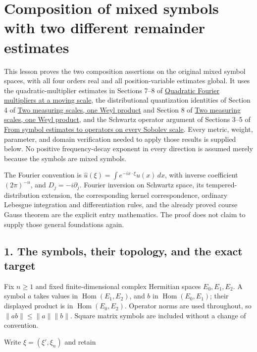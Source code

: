 \documentclass[
  11pt,
]{article}
\author{}
\date{}
\begin{document}
\section{Composition of mixed symbols with two different remainder
estimates}\label{composition-of-mixed-symbols-with-two-different-remainder-estimates}

This lesson proves the two composition assertions on the original mixed
symbol spaces, with all four orders real and all position-variable
estimates global. It uses the quadratic-multiplier estimates in Sections
7--8 of \href{gauss-transform-estimates.pdf}{Quadratic Fourier
multipliers at a moving scale}, the distributional quantization
identities of Section 4 of \href{weyl-metric-products.pdf}{Two measuring
scales, one Weyl product} and Section 8 of
\href{weyl-metric-products.pdf}{Two measuring scales, one Weyl product},
and the Schwartz operator argument of Sections 3--5 of
\href{euclidean-symbol-calculus.pdf}{From symbol estimates to operators
on every Sobolev scale}. Every metric, weight, parameter, and domain
verification needed to apply those results is supplied below. No
positive frequency-decay exponent in every direction is assumed merely
because the symbols are mixed symbols.

The Fourier convention is
\(\widehat u(\xi)=\int e^{-ix\cdot\xi}u(x)\,dx\), with inverse
coefficient \((2\pi)^{-n}\), and \(D_j=-i\partial_j\). Fourier inversion
on Schwartz space, its tempered-distribution extension, the
corresponding kernel correspondence, ordinary Lebesgue integration and
differentiation rules, and the already proved course Gauss theorem are
the explicit entry mathematics. The proof does not claim to supply those
general foundations again.

\subsection{1. The symbols, their topology, and the exact
target}\label{the-symbols-their-topology-and-the-exact-target}

Fix \(n\geq1\) and fixed finite-dimensional complex Hermitian spaces
\(E_0,E_1,E_2\). A symbol \(a\) takes values in
\(\operatorname{Hom}(E_1,E_2)\), and \(b\) in
\(\operatorname{Hom}(E_0,E_1)\); their displayed product is in
\(\operatorname{Hom}(E_0,E_2)\). Operator norms are used throughout, so
\(\|ab\|\leq\|a\|\|b\|\). Square matrix symbols are included without a
change of convention.

Write \(\xi=(\xi',\xi_n)\) and retain
\end{document}
